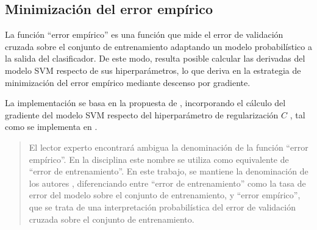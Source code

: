 %
%
\subsection{Minimización del error empírico}
%
La función ``error empírico'' es una función que mide el error de
validación cruzada sobre el conjunto de entrenamiento adaptando un
modelo probabilístico a la salida del clasificador. De este modo,
resulta posible calcular las derivadas del modelo SVM respecto de sus
hiperparámetros, lo que deriva en la estrategia de minimización del
error empírico mediante descenso por gradiente.

La implementación se basa en la propuesta de \cite{ayat}, incorporando
el cálculo del gradiente del modelo SVM respecto del hiperparámetro de
regularización $C$ \cite{keerthi,glasmachers}, tal como se implementa
en \cite{shark}.
%
\begin{quote}
  El lector experto encontrará ambigua la denominación de la función
  ``error empírico''.  En la disciplina este nombre se utiliza como
  equivalente de ``error de entrenamiento''.  En este trabajo, se
  mantiene la denominación de los autores \cite{ayat}, diferenciando
  entre ``error de entrenamiento'' como la tasa de error del modelo
  sobre el conjunto de entrenamiento, y ``error empírico'', que se
  trata de una interpretación probabilística del error de validación
  cruzada sobre el conjunto de entrenamiento.
\end{quote}
%
